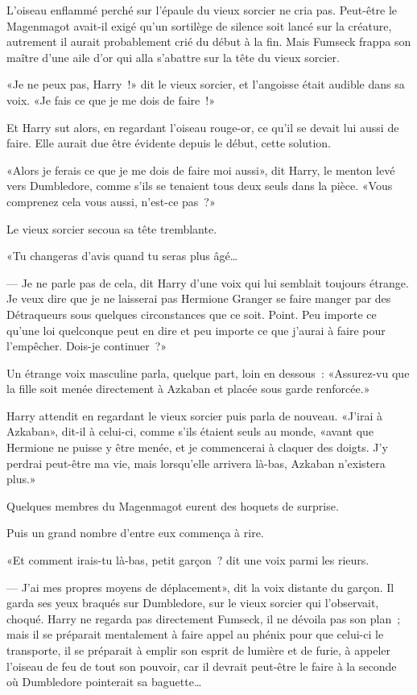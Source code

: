 L'oiseau enflammé perché sur l'épaule du vieux sorcier ne cria pas. Peut-être le Magenmagot avait-il exigé qu'un sortilège de silence soit lancé sur la créature, autrement il aurait probablement crié du début à la fin. Mais Fumseck frappa son maître d'une aile d'or qui alla s'abattre sur la tête du vieux sorcier.

«Je ne peux pas, Harry~!» dit le vieux sorcier, et l'angoisse était audible dans sa voix. «Je fais ce que je me dois de faire~!»

Et Harry sut alors, en regardant l'oiseau rouge-or, ce qu'il se devait lui aussi de faire. Elle aurait due être évidente depuis le début, cette solution.

«Alors je ferais ce que je me dois de faire moi aussi», dit Harry, le menton levé vers Dumbledore, comme s'ils se tenaient tous deux seuls dans la pièce. «Vous comprenez cela vous aussi, n'est-ce pas~?»

Le vieux sorcier secoua sa tête tremblante.

«Tu changeras d'avis quand tu seras plus âgé…

--- Je ne parle pas de cela, dit Harry d'une voix qui lui semblait toujours étrange. Je veux dire que je ne laisserai pas Hermione Granger se faire manger par des Détraqueurs sous quelques circonstances que ce soit. Point. Peu importe ce qu'une loi quelconque peut en dire et peu importe ce que j'aurai à faire pour l'empêcher. Dois-je continuer~?»

Un étrange voix masculine parla, quelque part, loin en dessous~: «Assurez-vu que la fille soit menée directement à Azkaban et placée sous garde renforcée.»

Harry attendit en regardant le vieux sorcier puis parla de nouveau. «J'irai à Azkaban», dit-il à celui-ci, comme s'ils étaient seuls au monde, «avant que Hermione ne puisse y être menée, et je commencerai à claquer des doigts. J'y perdrai peut-être ma vie, mais lorsqu'elle arrivera là-bas, Azkaban n'existera plus.»

Quelques membres du Magenmagot eurent des hoquets de surprise.

Puis un grand nombre d'entre eux commença à rire.

«Et comment irais-tu là-bas, petit garçon~? dit une voix parmi les rieurs.

--- J'ai mes propres moyens de déplacement», dit la voix distante du garçon. Il garda ses yeux braqués sur Dumbledore, sur le vieux sorcier qui l'observait, choqué. Harry ne regarda pas directement Fumseck, il ne dévoila pas son plan~; mais il se préparait mentalement à faire appel au phénix pour que celui-ci le transporte, il se préparait à emplir son esprit de lumière et de furie, à appeler l'oiseau de feu de tout son pouvoir, car il devrait peut-être le faire à la seconde où Dumbledore pointerait sa baguette…

